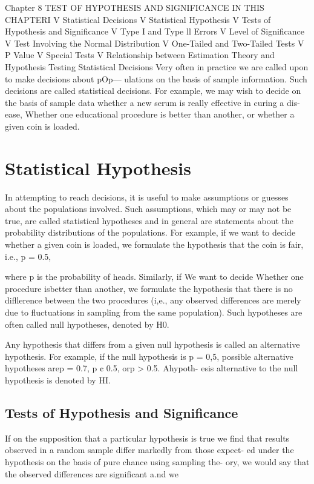 
Chapter 8
TEST OF
HYPOTHESIS AND
SIGNIFICANCE
IN THIS CHAPTERI
V Statistical Decisions
V Statistical Hypothesis
V Tests of Hypothesis and Signiﬁcance
V Type I and Type ll Errors
V Level of Signiﬁcance
V Test Involving the Normal Distribution
V One-Tailed and Two-Tailed Tests
V P Value
V Special Tests
V Relationship between Estimation
Theory and Hypothesis Testing
Statistical Decisions
Very often in practice we are called upon to make decisions about pOp—
ulations on the basis of sample information. Such decisions are called
statistical decisions. For example, we may wish to decide on the basis
of sample data whether a new serum is really effective in curing a dis-
ease, Whether one educational procedure is better than another, or whether a given coin is loaded.
\section{Statistical Hypothesis}
In attempting to reach decisions, it is useful to make assumptions or
guesses about the populations involved. Such assumptions, which may
or may not be true, are called statistical hypotheses and in general are
statements about the probability distributions of the populations.
For example, if we want to decide whether a given coin is loaded, we formulate the
hypothesis that the coin is fair, i.e., p = 0.5, 

where p is the probability of heads. Similarly, if We want to decide Whether one procedure isbetter than another, we formulate the hypothesis that there is no diﬂlerence between the two procedures (i,e., any observed differences are
merely due to ﬂuctuations in sampling from the same population). Such hypotheses are often called null hypotheses, denoted by H0.

Any hypothesis that differs from a given null hypothesis is called
an alternative hypothesis. For example, if the null hypothesis is p = 0,5,
possible alternative hypotheses arep = 0.7, p ¢ 0.5, orp > 0.5. Ahypoth-
esis alternative to the null hypothesis is denoted by HI.
\subsection{Tests of Hypothesis and Significance}
If on the supposition that a particular hypothesis is true we ﬁnd that
results observed in a random sample differ markedly from those expect-
ed under the hypothesis on the basis of pure chance using sampling the-
ory, we would say that the observed differences are signiﬁcant a.nd we


